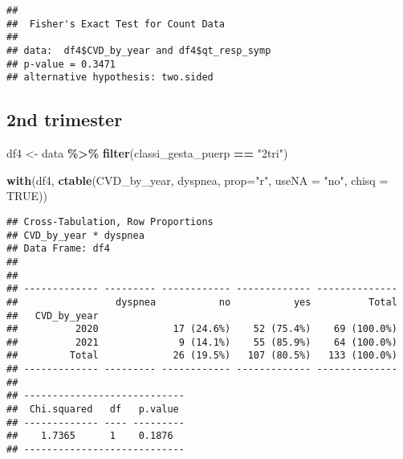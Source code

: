 \documentclass[
]{article}
\newenvironment{Shaded}{\begin{snugshade}}{\end{snugshade}}
\newcommand{\AttributeTok}[1]{\textcolor[rgb]{0.13,0.29,0.53}{#1}}
\newcommand{\ConstantTok}[1]{\textcolor[rgb]{0.56,0.35,0.01}{#1}}
\newcommand{\FunctionTok}[1]{\textcolor[rgb]{0.13,0.29,0.53}{\textbf{#1}}}
\newcommand{\NormalTok}[1]{#1}
\newcommand{\OtherTok}[1]{\textcolor[rgb]{0.56,0.35,0.01}{#1}}
\newcommand{\SpecialCharTok}[1]{\textcolor[rgb]{0.81,0.36,0.00}{\textbf{#1}}}
\newcommand{\StringTok}[1]{\textcolor[rgb]{0.31,0.60,0.02}{#1}}
\begin{document}
\begin{Shaded}
\end{Shaded}

\begin{verbatim}
## 
##  Fisher's Exact Test for Count Data
## 
## data:  df4$CVD_by_year and df4$qt_resp_symp
## p-value = 0.3471
## alternative hypothesis: two.sided
\end{verbatim}

\hypertarget{nd-trimester}{%
\subsection{2nd trimester}\label{nd-trimester}}

\begin{Shaded}
\begin{Highlighting}[]
\NormalTok{df4 }\OtherTok{\textless{}{-}}\NormalTok{ data }\SpecialCharTok{\%\textgreater{}\%} 
  \FunctionTok{filter}\NormalTok{(classi\_gesta\_puerp }\SpecialCharTok{==} \StringTok{"2tri"}\NormalTok{)}

\FunctionTok{with}\NormalTok{(df4, }\FunctionTok{ctable}\NormalTok{(CVD\_by\_year, dyspnea, }\AttributeTok{prop=}\StringTok{"r"}\NormalTok{, }\AttributeTok{useNA =} \StringTok{"no"}\NormalTok{, }\AttributeTok{chisq =} \ConstantTok{TRUE}\NormalTok{))}
\end{Highlighting}
\end{Shaded}

\begin{verbatim}
## Cross-Tabulation, Row Proportions  
## CVD_by_year * dyspnea  
## Data Frame: df4  
## 
## 
## ------------- --------- ------------ ------------- --------------
##                 dyspnea           no           yes          Total
##   CVD_by_year                                                    
##          2020             17 (24.6%)    52 (75.4%)    69 (100.0%)
##          2021              9 (14.1%)    55 (85.9%)    64 (100.0%)
##         Total             26 (19.5%)   107 (80.5%)   133 (100.0%)
## ------------- --------- ------------ ------------- --------------
## 
## ----------------------------
##  Chi.squared   df   p.value 
## ------------- ---- ---------
##    1.7365      1    0.1876  
## ----------------------------
\end{verbatim}
\end{document}
